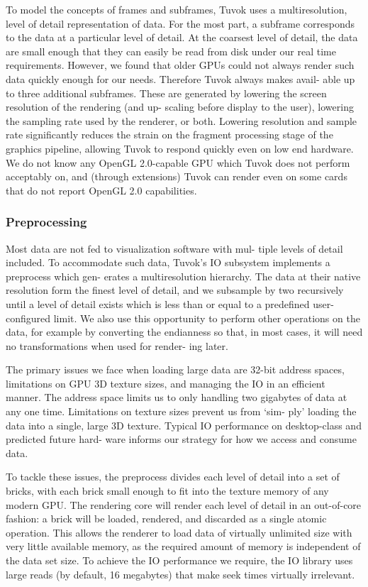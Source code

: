 To model the concepts of frames and subframes, Tuvok
uses a multiresolution, level of detail representation of data.
For the most part, a subframe corresponds to the data at
a particular level of detail. At the coarsest level of detail,
the data are small enough that they can easily be read from
disk under our real time requirements. However, we found
that older GPUs could not always render such data quickly
enough for our needs. Therefore Tuvok always makes avail-
able up to three additional subframes. These are generated
by lowering the screen resolution of the rendering (and up-
scaling before display to the user), lowering the sampling
rate used by the renderer, or both. Lowering resolution and
sample rate significantly reduces the strain on the fragment
processing stage of the graphics pipeline, allowing Tuvok
to respond quickly even on low end hardware. We do not
know any OpenGL 2.0-capable GPU which Tuvok does not
perform acceptably on, and (through extensions) Tuvok can
render even on some cards that do not report OpenGL 2.0
capabilities.

\subsubsection{Preprocessing}

Most data are not fed to visualization software with mul-
tiple levels of detail included. To accommodate such data,
Tuvok’s IO subsystem implements a preprocess which gen-
erates a multiresolution hierarchy. The data at their native
resolution form the finest level of detail, and we subsample
by two recursively until a level of detail exists which is less
than or equal to a predefined user-configured limit. We also
use this opportunity to perform other operations on the data,
for example by converting the endianness so that, in most
cases, it will need no transformations when used for render-
ing later.

The primary issues we face when loading large data are
32-bit address spaces, limitations on GPU 3D texture sizes,
and managing the IO in an efficient manner. The address
space limits us to only handling two gigabytes of data at any
one time. Limitations on texture sizes prevent us from ‘sim-
ply’ loading the data into a single, large 3D texture. Typical
IO performance on desktop-class and predicted future hard-
ware informs our strategy for how we access and consume
data.

To tackle these issues, the preprocess divides each level of
detail into a set of bricks, with each brick small enough to fit
into the texture memory of any modern GPU. The rendering
core will render each level of detail in an out-of-core fashion:
a brick will be loaded, rendered, and discarded as a single
atomic operation. This allows the renderer to load data of
virtually unlimited size with very little available memory, as
the required amount of memory is independent of the data
set size. To achieve the IO performance we require, the IO
library uses large reads (by default, 16 megabytes) that make
seek times virtually irrelevant.

